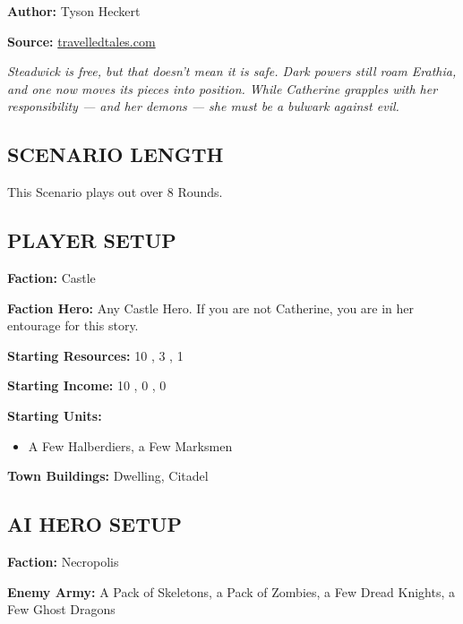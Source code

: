 \cleardoublepage{}

\begin{multicols*}{2}

\textbf{Author:} Tyson Heckert

\textbf{Source:} \href{https://travelledtales.com}{travelledtales.com}

\textit{Steadwick is free, but that doesn't mean it is safe.
Dark powers still roam Erathia, and one now moves its pieces into position.
While Catherine grapples with her responsibility — and her demons — she must be a bulwark against evil.}

\subsection*{\MakeUppercase{Scenario length}}

This Scenario plays out over 8 Rounds.

\subsection*{\MakeUppercase{Player setup}}

\textbf{Faction:} Castle

\textbf{Faction Hero:} Any Castle Hero. If you are not Catherine, you are in her entourage for this story.

\textbf{Starting Resources:} 10 , 3 , 1 

\textbf{Starting Income:} 10 , 0 , 0 

\textbf{Starting Units:}
\begin{itemize}
  \item A Few Halberdiers, a Few Marksmen
\end{itemize}

\textbf{Town Buildings:}  Dwelling, Citadel

\subsection*{\MakeUppercase{AI Hero setup}}

\textbf{Faction:} Necropolis

\textbf{Enemy Army:} A Pack of Skeletons, a Pack of Zombies, a Few Dread Knights, a Few Ghost Dragons


\end{multicols*}
